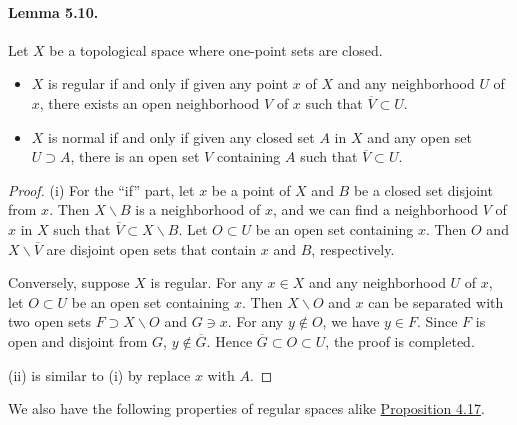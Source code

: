 \documentclass{article}
\numberwithin{equation}{section}
\theoremstyle{plain}
\theoremstyle{definition}
\begin{document}
\paragraph{Lemma 5.10.\label{lemma:5.10}} Let $X$ be a topological space where one-point sets are closed.
\begin{itemize}
	\item[(i)] $X$ is regular if and only if given any point $x$ of $X$ and any neighborhood $U$ of $x$, there exists an open neighborhood $V$ of $x$ such that $\overline{V}\subset U$.
	\item[(ii)] $X$ is normal if and only if given any closed set $A$ in $X$ and any open set $U\supset A$, there is an open set $V$ containing $A$ such that $\overline{V}\subset U$.
\end{itemize}
\begin{proof}
(i) For the ``if'' part, let $x$ be a point of $X$ and $B$ be a closed set disjoint from $x$. Then $X\backslash B$ is a neighborhood of $x$, and we can find a neighborhood $V$ of $x$ in $X$ such that $\overline{V}\subset X\backslash B$.  Let $O\subset U$ be an open set containing $x$. Then $O$ and $X\backslash\overline{V}$ are disjoint open sets that contain $x$ and $B$, respectively.

Conversely, suppose $X$ is regular. For any $x\in X$ and any neighborhood $U$ of $x$, let $O\subset U$ be an open set containing $x$. Then $X\backslash O$ and $x$ can be separated with two open sets $F\supset X\backslash O$ and $G\ni x$. For any $y\notin O$, we have $y\in F$. Since $F$ is open and disjoint from $G$, $y\notin \overline{G}$. Hence $\overline{G}\subset O\subset U$, the proof is completed.

(ii) is similar to (i) by replace $x$ with $A$.
\end{proof}

We also have the following properties of regular spaces alike \hyperref[prop:4.17]{Proposition 4.17}.
\end{document}

